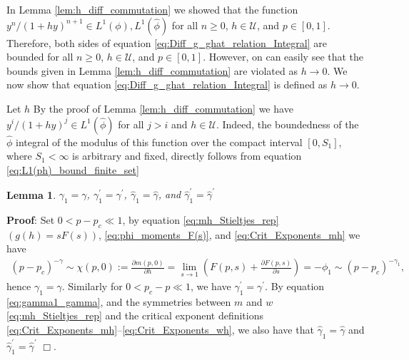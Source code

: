 \documentclass[english,12pt,jmp,graphicx]{revtex4-1}
\newtheorem{lemma}{Lemma}[section]
\newcommand{\ph}{\hat{\phi}}
\newcommand{\gh}{\hat{\gamma}}
\begin{document}
In Lemma \ref{lem:h_diff_commutation} we showed that the function
$y^n/(1+hy)^{n+1}\in L^1(\phi),L^1(\ph)$ for all $n\geq0$, $h\in\mathcal{U}$, and
$p\in[0,1]$. Therefore, both sides of equation
\eqref{eq:Diff_g_ghat_relation_Integral} are bounded for all
$n\geq0$, $h\in\mathcal{U}$, and $p\in[0,1]$. However, on can easily see that the
bounds given in Lemma \ref{lem:h_diff_commutation} are violated as
$h\to0$. We now show that equation
\eqref{eq:Diff_g_ghat_relation_Integral} is defined as $h\to0$.

Let $h$ By the proof of Lemma \ref{lem:h_diff_commutation} we have
$y^i/(1+hy)^j\in L^1(\ph)$ for all $j>i$ and $h\in\mathcal{U}$. Indeed, the
boundedness of the $\ph$ integral of the modulus of this function over
the compact interval $[0,S_1]$, where $S_1<\infty$ is arbitrary and fixed,
directly follows from equation
\eqref{eq:L1(ph)_bound_finite_set}  
%
\begin{lemma}\label{lem:nonzero_gamma1_etc}
  $\gamma_1=\gamma$, $\gamma_1^\prime=\gamma^\prime$, $\gh_1=\gh$, and $\gh_1^\prime=\gh^\prime$
\end{lemma}
%
\noindent \textbf{Proof}:
%
Set $0<p-p_c\ll1$, by equation \eqref{eq:mh_Stieltjes_rep}
$(g(h)=sF(s))$, \eqref{eq:phi_moments_F(s)}, and
\eqref{eq:Crit_Exponents_mh} we have    
%
\begin{align}\label{eq:gamma1_gamma}
  (p-p_c)^{-\gamma}\sim\chi(p,0)
          :=\frac{\partial m(p,0)}{\partial h}
          =\lim_{s\to1}\left(F(p,s)+\frac{\partial F(p,s)}{\partial s}\right)
          =-\phi_1\sim(p-p_c)^{-\gamma_1},
\end{align}
%
hence $\gamma_1=\gamma$. Similarly for $0<p_c-p\ll1$, we have $\gamma_1^\prime=\gamma^\prime$. By
equation \eqref{eq:gamma1_gamma}, and the symmetries between $m$ and
$w$ \eqref{eq:mh_Stieltjes_rep} and the critical exponent definitions 
\eqref{eq:Crit_Exponents_mh}--\eqref{eq:Crit_Exponents_wh}, we also
have that $\gh_1=\gh$ and $\gh_1^\prime=\gh^\prime$ $\Box$.   
\end{document}
